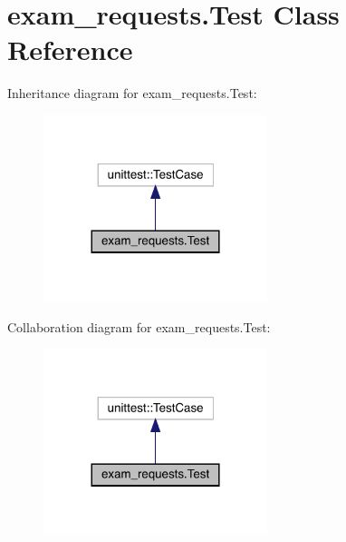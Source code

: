 \hypertarget{classexam__requests_1_1Test}{}\section{exam\+\_\+requests.\+Test Class Reference}
\label{classexam__requests_1_1Test}


Inheritance diagram for exam\+\_\+requests.\+Test\+:
\nopagebreak
\begin{figure}[H]
\begin{center}
\leavevmode
\includegraphics[width=185pt]{classexam__requests_1_1Test__inherit__graph}
\end{center}
\end{figure}


Collaboration diagram for exam\+\_\+requests.\+Test\+:
\nopagebreak
\begin{figure}[H]
\begin{center}
\leavevmode
\includegraphics[width=185pt]{classexam__requests_1_1Test__coll__graph}
\end{center}
\end{figure}
